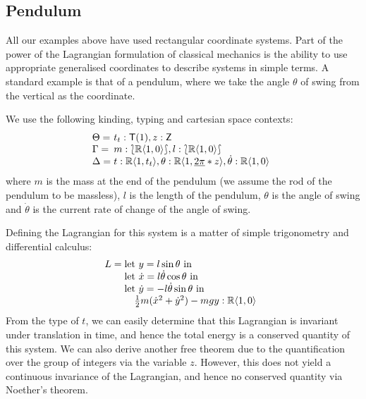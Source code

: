 \documentclass{sigplanconf}
\newcommand{\typeOfCartSp}[1]{\lbag #1 \rbag}
\theoremstyle{examplestyle}
\begin{document}
\subsection{Pendulum}

All our examples above have used rectangular coordinate systems. Part
of the power of the Lagrangian formulation of classical mechanics is
the ability to use appropriate generalised coordinates to describe
systems in simple terms. A standard example is that of a pendulum,
where we take the angle $\theta$ of swing from the vertical as the
coordinate.

We use the following kinding, typing and cartesian space contexts:
\begin{displaymath}
  \begin{array}{l@{\hspace{0.3em}}l}
    \Theta = & t_t : \mathsf{T}(1), z : \mathsf{Z} \\
    \Gamma = & m : \typeOfCartSp{\mathbb{R}\langle 1, 0 \rangle}, l : \typeOfCartSp{\mathbb{R}\langle 1, 0 \rangle} \\
    \Delta = &
    \begin{array}[t]{@{}l}
      t : \mathbb{R}\langle 1, t_t \rangle, \theta : \mathbb{R}\langle 1, \underline{2\pi}*z \rangle, \dot{\theta} : \mathbb{R}\langle 1, 0 \rangle
\end{array}
  \end{array}
\end{displaymath}
where $m$ is the mass at the end of the pendulum (we assume the rod of
the pendulum to be massless), $l$ is the length of the pendulum,
$\theta$ is the angle of swing and $\dot{\theta}$ is the current rate
of change of the angle of swing.

Defining the Lagrangian for this system is a matter of simple
trigonometry and differential calculus:
\begin{displaymath}
  L =
  \begin{array}[t]{@{}l}
    \textrm{let }y = l\sin \theta \textrm{ in} \\
    \textrm{let }\dot{x} = l\dot{\theta}\cos \theta \textrm{ in} \\
    \textrm{let }\dot{y} = - l\dot{\theta}\sin \theta \textrm{ in} \\
    \quad \frac{1}{2}m(\dot{x}^2 + \dot{y}^2) - mgy : \mathbb{R}\langle 1, 0 \rangle
  \end{array}
\end{displaymath}
From the type of $t$, we can easily determine that this Lagrangian is
invariant under translation in time, and hence the total energy is a
conserved quantity of this system. We can also derive another free
theorem due to the quantification over the group of integers via the
variable $z$. However, this does not yield a continuous invariance of
the Lagrangian, and hence no conserved quantity via Noether's theorem.
\end{document}
